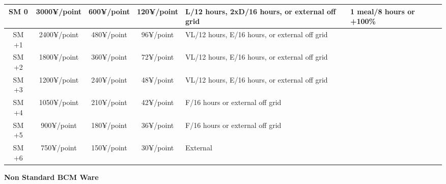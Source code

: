 \begin{adjustwidth}{-9mm}{}
{\begin{tabularx}{1.45\textwidth}{|ccccXX|}
		\hline
		SM 0 & 3000¥/point & 600¥/point & 120¥/point & L/12 hours, 2xD/16 hours, or external off grid & 1 meal/8 hours or +100\% \\
		\hline
		SM +1 & 2400¥/point & 480¥/point & 96¥/point & VL/12 hours, E/16 hours, or external off grid &  \\
		SM +2 & 1800¥/point & 360¥/point & 72¥/point & VL/12 hours, E/16 hours, or external off grid &  \\
		SM +3 & 1200¥/point & 240¥/point & 48¥/point & VL/12 hours, E/16 hours, or external off grid &  \\
		\hline
		SM +4 & 1050¥/point & 210¥/point & 42¥/point & F/16 hours or external off grid &  \\
		SM +5 & 900¥/point & 180¥/point & 36¥/point & F/16 hours or external off grid &  \\
		\hline
		SM +6 & 750¥/point & 150¥/point & 30¥/point & External &  \\
		\hline
	\end{tabularx}
}
\end{adjustwidth}
	
	
	\textbf{Non Standard BCM Ware}
	
